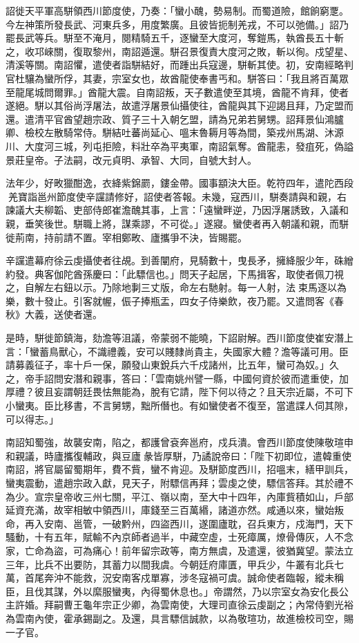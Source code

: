\begin{pinyinscope}
 詔徙天平軍高駢領西川節度使，乃奏：「蠻小醜，勢易制。而蜀道險，館餉窮覂。今左神策所發長武、河東兵多，用度繁廣。且彼皆扼制羌戎，不可以弛備。」詔乃罷長武等兵。駢至不淹月，閱精騎五千，逐蠻至大度河，奪鎧馬，執酋長五十斬之，收邛崍關，復取黎州，南詔遁還。駢召景復責大度河之敗，斬以徇。戍望星、清溪等關。南詔懼，遣使者詣駢結好，而踵出兵寇邊，駢斬其使。初，安南經略判官杜驤為蠻所俘，其妻，宗室女也，故酋龍使奉書丐和。駢答曰：「我且將百萬眾至龍尾城問爾罪。」酋龍大震。自南詔叛，天子數遣使至其境，酋龍不肯拜，使者遂絕。駢以其俗尚浮屠法，故遣浮屠景仙攝使往，酋龍與其下迎謁且拜，乃定盟而還。遣清平官酋望趙宗政、質子三十入朝乞盟，請為兄弟若舅甥。詔拜景仙鴻臚卿、檢校左散騎常侍。駢結吐蕃尚延心、嗢末魯耨月等為間，築戎州馬湖、沐源川、大度河三城，列屯拒險，料壯卒為平夷軍，南詔氣奪。酋龍恚，發疽死，偽謚景莊皇帝。子法嗣，改元貞明、承智、大同，自號大封人。



 法年少，好畋獵酣逸，衣絳紫錦罽，鏤金帶。國事顓決大臣。乾符四年，遣陀西段羌寶詣邕州節度使辛讜請修好，詔使者答報。未幾，寇西川，駢奏請與和親，右諫議大夫柳韜、吏部侍郎崔澹醜其事，上言：「遠蠻畔逆，乃因浮屠誘致，入議和親，垂笑後世。駢職上將，謀乘謬，不可從。」遂寢。蠻使者再入朝議和親，而駢徙荊南，持前請不置。宰相鄭畋、廬攜爭不決，皆賜罷。



 辛讜遣幕府徐云虔攝使者往覘。到善闡府，見騎數十，曳長矛，擁絳服少年，硃繒約發。典客伽陀酋孫慶曰：「此驃信也。」問天子起居，下馬揖客，取使者佩刀視之，自解左右鈕以示。乃除地剚三丈版，命左右馳射。每一人射，法束馬逐以為樂，數十發止。引客就幄，侲子捧瓶盂，四女子侍樂飲，夜乃罷。又遣問客《春秋》大義，送使者還。



 是時，駢徙節鎮海，劾澹等沮議，帝蒙弱不能曉，下詔尉解。西川節度使崔安潛上言：「蠻蓄鳥獸心，不識禮義，安可以賤隸尚貴主，失國家大體？澹等議可用。臣請募義征子，率十戶一保，願發山東銳兵六千戍諸州，比五年，蠻可為奴。」久之，帝手詔問安潛和親事，答曰：「雲南姚州譬一縣，中國何資於彼而遣重使，加厚禮？彼且妄謂朝廷畏怯無能為，脫有它請，陛下何以待之？且天宗近屬，不可下小蠻夷。臣比移書，不言舅甥，黜所僭也。有如蠻使者不復至，當遣諜人伺其隙，可以得志。」



 南詔知蜀強，故襲安南，陷之，都護曾袞奔邕府，戍兵潰。會西川節度使陳敬瑄申和親議，時廬攜復輔政，與豆廬彖皆厚駢，乃譎說帝曰：「陛下初即位，遣韓重使南詔，將官屬留蜀期年，費不貲，蠻不肯迎。及駢節度西川，招嗢末，繕甲訓兵，蠻夷震動，遣趙宗政入獻，見天子，附驃信再拜；雲虔之使，驃信答拜。其於禮不為少。宣宗皇帝收三州七關，平江、嶺以南，至大中十四年，內庫貲積如山，戶部延資充滿，故宰相敏中領西川，庫錢至三百萬緡，諸道亦然。咸通以來，蠻始叛命，再入安南、邕管，一破黔州，四盜西川，遂圍廬耽，召兵東方，戍海門，天下騷動，十有五年，賦輸不內京師者過半，中藏空虛，士死瘴厲，燎骨傳灰，人不念家，亡命為盜，可為痛心！前年留宗政等，南方無虞，及遣還，彼猶冀望。蒙法立三年，比兵不出要防，其蓄力以間我虞。今朝廷府庫匱，甲兵少，牛叢有北兵七萬，首尾奔沖不能救，況安南客戍單寡，涉冬寇禍可虞。誠命使者臨報，縱未稱臣，且伐其謀，外以縻服蠻夷，內得蜀休息也。」帝謂然，乃以宗室女為安化長公主許婚。拜嗣曹王龜年宗正少卿，為雲南使，大理司直徐云虔副之；內常侍劉光裕為雲南內使，霍承錫副之。及還，具言驃信誠款，以為敬瑄功，故進檢校司空，賜一子官。




\end{pinyinscope}

